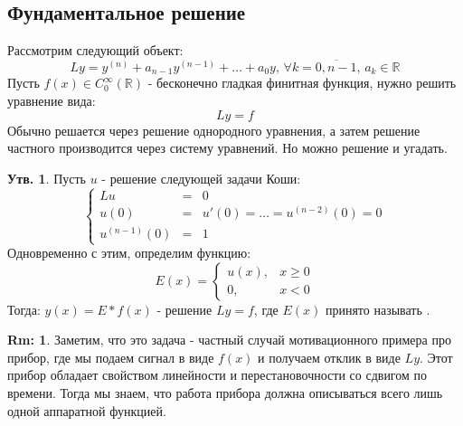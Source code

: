 \documentclass[12pt]{article}
\newcommand{\MR}{\mathbb{R}}
\theoremstyle{definition}
\newtheorem{rem}{Rm:}
\newtheorem{prop}{Утв.}
\begin{document}
\subsection*{Фундаментальное решение}
Рассмотрим следующий объект: 
$$
	L y =	y^{(n)} + a_{n-1} y^{(n-1)} + \dotsc + a_0 y, \, \forall k = \overline{0 ,n-1}, \, a_k \in \MR
$$
Пусть $f(x) \in C_0^{\infty}(\MR)$ - бесконечно гладкая финитная функция,  нужно решить уравнение вида: 
$$
	Ly =f
$$ 
Обычно решается через решение однородного уравнения, а затем решение частного производится через систему уравнений. Но можно решение и угадать.
\begin{prop}
	Пусть $u$ - решение следующей задачи Коши:
	$$
		\left\{
		\begin{array}{rcl}
			Lu &=& 0\\
			u(0) &=& u'(0) = \dotsc = u^{(n-2)}(0) = 0\\
			u^{(n-1)}(0) &=& 1
		\end{array}
		\right.
	$$
	Одновременно с этим, определим функцию: 
	$$
		E(x) = \left\{
		\begin{array}{rl}
			u(x), & x \geq 0\\
			0, & x < 0
		\end{array}
		\right.
	$$
	Тогда: $y(x) = E*f(x)$ - решение $Ly =f$, где $E(x)$ принято называть .
\end{prop}
\begin{rem}
	Заметим, что это задача - частный случай мотивационного примера про прибор, где мы подаем сигнал в виде $f(x)$ и получаем отклик в виде $Ly$. Этот прибор обладает свойством линейности и перестановочности со сдвигом по времени. Тогда мы знаем, что работа прибора должна описываться всего лишь одной аппаратной функцией.
\end{rem}
\end{document}
